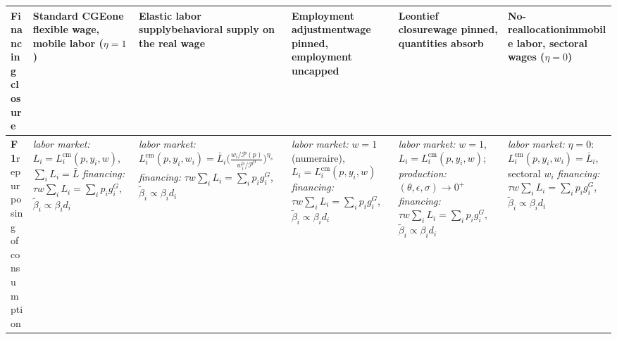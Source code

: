 \begin{table}[htbp]
\centering
\footnotesize
\setlength{\tabcolsep}{2pt}
\renewcommand{\arraystretch}{1.4}
\begin{tabular}{@{}>{\raggedright\arraybackslash}p{1.85cm}
                  >{\raggedright\arraybackslash}p{2.45cm}
                  >{\raggedright\arraybackslash}p{2.45cm}
                  >{\raggedright\arraybackslash}p{2.45cm}
                  >{\raggedright\arraybackslash}p{2.45cm}
                  >{\raggedright\arraybackslash}p{2.45cm}@{}}
\toprule
\textbf{Financing closure}
& \textbf{Standard CGE}\newline \scriptsize one flexible wage, mobile labor ($\eta = 1$)
& \textbf{Elastic labor supply}\newline \scriptsize behavioral supply on the real wage
& \textbf{Employment adjustment}\newline \scriptsize wage pinned, employment uncapped
& \textbf{Leontief closure}\newline \scriptsize wage pinned, quantities absorb
& \textbf{No-reallocation}\newline \scriptsize immobile labor, sectoral wages ($\eta = 0$) \\
\midrule

\textbf{F1}\newline \scriptsize repurposing of consumption
& \textit{labor market:} $L_i = L_i^{\mathrm{cm}}(p, y_i, w)$, $\sum_i L_i = \bar L$
  \newline \textit{financing:} $\tau w \sum_i L_i = \sum_i p_i g^{G}_i$, $\tilde\beta_i \propto \beta_i d_i$
& \textit{labor market:} $L_i^{\mathrm{cm}}(p, y_i, w_i) = \bar L_i \allowbreak \bigl(\tfrac{w_i/\mathcal{P}(p)}{w_i^{0}/\mathcal{P}^{0}}\bigr)^{\eta_s}$
  \newline \textit{financing:} $\tau w \sum_i L_i = \sum_i p_i g^{G}_i$, $\tilde\beta_i \propto \beta_i d_i$
& \textit{labor market:} $w = 1$ (numeraire), $L_i = L_i^{\mathrm{cm}}(p, y_i, w)$
  \newline \textit{financing:} $\tau w \sum_i L_i = \sum_i p_i g^{G}_i$, $\tilde\beta_i \propto \beta_i d_i$
& \textit{labor market:} $w = 1$, $L_i = L_i^{\mathrm{cm}}(p, y_i, w)$; \textit{production:} $(\theta, \epsilon, \sigma) \to 0^{+}$
  \newline \textit{financing:} $\tau w \sum_i L_i = \sum_i p_i g^{G}_i$, $\tilde\beta_i \propto \beta_i d_i$
& \textit{labor market:} $\eta = 0$: $L_i^{\mathrm{cm}}(p, y_i, w_i) = \bar L_i$, sectoral $w_i$
  \newline \textit{financing:} $\tau w \sum_i L_i = \sum_i p_i g^{G}_i$, $\tilde\beta_i \propto \beta_i d_i$ \\
\midrule


\end{tabular}
\end{table}
